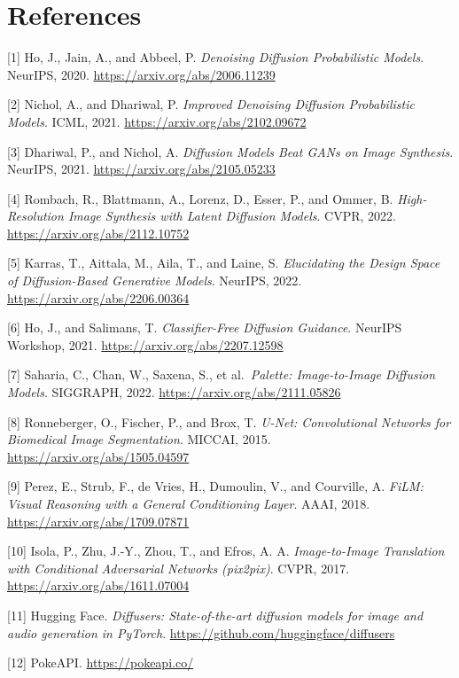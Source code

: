 \documentclass[
]{article}
\begin{document}
\label{main-report-end}
\clearpage
\appendix
\section{References}\label{references}

{[}1{]} Ho, J., Jain, A., and Abbeel, P. \emph{Denoising Diffusion
Probabilistic Models}. NeurIPS, 2020.
\url{https://arxiv.org/abs/2006.11239}

{[}2{]} Nichol, A., and Dhariwal, P. \emph{Improved Denoising Diffusion
Probabilistic Models}. ICML, 2021.
\url{https://arxiv.org/abs/2102.09672}

{[}3{]} Dhariwal, P., and Nichol, A. \emph{Diffusion Models Beat GANs on
Image Synthesis}. NeurIPS, 2021. \url{https://arxiv.org/abs/2105.05233}

{[}4{]} Rombach, R., Blattmann, A., Lorenz, D., Esser, P., and Ommer, B.
\emph{High-Resolution Image Synthesis with Latent Diffusion Models}.
CVPR, 2022. \url{https://arxiv.org/abs/2112.10752}

{[}5{]} Karras, T., Aittala, M., Aila, T., and Laine, S.
\emph{Elucidating the Design Space of Diffusion-Based Generative
Models}. NeurIPS, 2022. \url{https://arxiv.org/abs/2206.00364}

{[}6{]} Ho, J., and Salimans, T. \emph{Classifier-Free Diffusion
Guidance}. NeurIPS Workshop, 2021.
\url{https://arxiv.org/abs/2207.12598}

{[}7{]} Saharia, C., Chan, W., Saxena, S., et al.~\emph{Palette:
Image-to-Image Diffusion Models}. SIGGRAPH, 2022.
\url{https://arxiv.org/abs/2111.05826}

{[}8{]} Ronneberger, O., Fischer, P., and Brox, T. \emph{U-Net:
Convolutional Networks for Biomedical Image Segmentation}. MICCAI, 2015.
\url{https://arxiv.org/abs/1505.04597}

{[}9{]} Perez, E., Strub, F., de Vries, H., Dumoulin, V., and Courville,
A. \emph{FiLM: Visual Reasoning with a General Conditioning Layer}.
AAAI, 2018. \url{https://arxiv.org/abs/1709.07871}

{[}10{]} Isola, P., Zhu, J.-Y., Zhou, T., and Efros, A. A.
\emph{Image-to-Image Translation with Conditional Adversarial Networks
(pix2pix)}. CVPR, 2017. \url{https://arxiv.org/abs/1611.07004}

{[}11{]} Hugging Face. \emph{Diffusers: State-of-the-art diffusion
models for image and audio generation in PyTorch}.
\url{https://github.com/huggingface/diffusers}

{[}12{]} PokeAPI. \url{https://pokeapi.co/}
\end{document}
